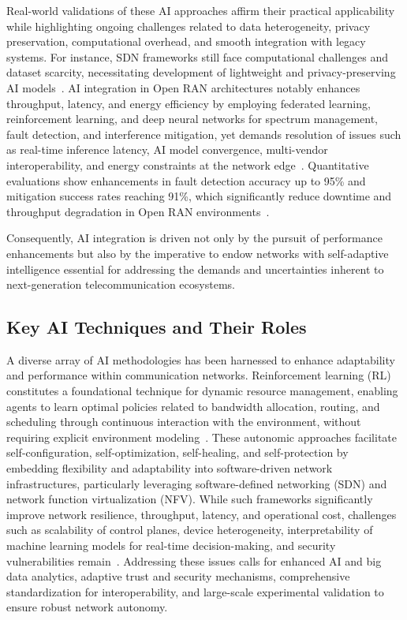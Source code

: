\documentclass[sigconf]{acmart}
\begin{document}
Real-world validations of these AI approaches affirm their practical applicability while highlighting ongoing challenges related to data heterogeneity, privacy preservation, computational overhead, and smooth integration with legacy systems. For instance, SDN frameworks still face computational challenges and dataset scarcity, necessitating development of lightweight and privacy-preserving AI models~\cite{ref52}. AI integration in Open RAN architectures notably enhances throughput, latency, and energy efficiency by employing federated learning, reinforcement learning, and deep neural networks for spectrum management, fault detection, and interference mitigation, yet demands resolution of issues such as real-time inference latency, AI model convergence, multi-vendor interoperability, and energy constraints at the network edge~\cite{ref54,ref55}. Quantitative evaluations show enhancements in fault detection accuracy up to 95\% and mitigation success rates reaching 91\%, which significantly reduce downtime and throughput degradation in Open RAN environments~\cite{ref55}. 

Consequently, AI integration is driven not only by the pursuit of performance enhancements but also by the imperative to endow networks with self-adaptive intelligence essential for addressing the demands and uncertainties inherent to next-generation telecommunication ecosystems.

\subsection{Key AI Techniques and Their Roles}

A diverse array of AI methodologies has been harnessed to enhance adaptability and performance within communication networks. Reinforcement learning (RL) constitutes a foundational technique for dynamic resource management, enabling agents to learn optimal policies related to bandwidth allocation, routing, and scheduling through continuous interaction with the environment, without requiring explicit environment modeling~\cite{ref11,ref12}. These autonomic approaches facilitate self-configuration, self-optimization, self-healing, and self-protection by embedding flexibility and adaptability into software-driven network infrastructures, particularly leveraging software-defined networking (SDN) and network function virtualization (NFV). While such frameworks significantly improve network resilience, throughput, latency, and operational cost, challenges such as scalability of control planes, device heterogeneity, interpretability of machine learning models for real-time decision-making, and security vulnerabilities remain~\cite{ref11}. Addressing these issues calls for enhanced AI and big data analytics, adaptive trust and security mechanisms, comprehensive standardization for interoperability, and large-scale experimental validation to ensure robust network autonomy.
\end{document}
